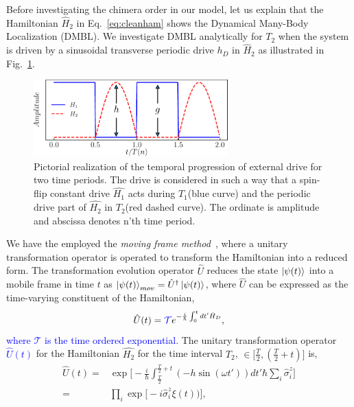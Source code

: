 \documentclass[%
reprint,
superscriptaddress,
amsmath,amssymb,showkeys,
aps,
prb,
]{revtex4-2}
\newcommand{\blue}[1]{\textcolor{blue}{#1}}
\begin{document}
	Before investigating the chimera order in our model, let us explain that the Hamiltonian $\hat{H}_2$ in Eq.~\eqref{eq:cleanham} shows the Dynamical Many-Body Localization (DMBL). We investigate DMBL analytically for $T_2$  when the system is driven by a sinusoidal transverse periodic drive $h_D$ in $\hat{H}_2$ as illustrated in Fig.~\ref{Fig:time_distribution}.
	\begin{figure}[t!]
		\begin{center}
			\includegraphics[width=7.5cm]{drive_distribution.pdf}
		\end{center}
		\caption[]{Pictorial realization of the temporal progression of external drive for two time periods. The drive is considered in such a way that a spin-flip constant drive $\hat{H_1}$ acts during $T_1$(blue curve) and the periodic drive part of $\hat{H_2}$ in $T_2$(red dashed curve). The ordinate is amplitude and abscissa denotes n'th time period.}
		\label{Fig:time_distribution}
	\end{figure}	
	We have the employed the \textit{moving frame method}~\cite{haldar_dynamical_2021}, where a unitary transformation operator is operated to transform the Hamiltonian into a reduced form. The transformation evolution operator $\hat{U}$ reduces the state $\ket{\psi(t)}$ into a mobile frame in time $t$ as $\ket{\psi(t)}_{mov} = \hat{U}^\dagger \ket{\psi(t)}$, where $\hat{U}$ can be expressed as the time-varying constituent of the Hamiltonian,
	\begin{equation}
		\hat{U}(t) = \blue{\mathcal{T}} e^{-\frac{i}{\hbar}\int_{0}^{t} dt' \hat{H}_D},
		\label{eq:rot1}
	\end{equation}
	\blue{where $\mathcal{T}$ is the time ordered exponential}. The unitary transformation operator \blue{$\hat{U}(t)$} for the Hamiltonian $\hat{H_2}$ for the time interval $T_2$, $\in{\Big[\frac{T}{2}, (\frac{T}{2}+t) \Big]}$ is,
	\begin{align}
		\hat{U}(t) =& \exp \Bigg[-\frac{i}{\hbar}\int_{\frac{T}{2}}^{\frac{T}{2}+t} (-h \sin(\omega t'))dt'\hbar\sum_i\hat{\sigma}^z_i\Bigg]\nonumber\\
		=& \prod_{i} \exp\Big[-i \hat{\sigma}^z_i\xi(t))\Big],
	\end{align}	
\end{document}
